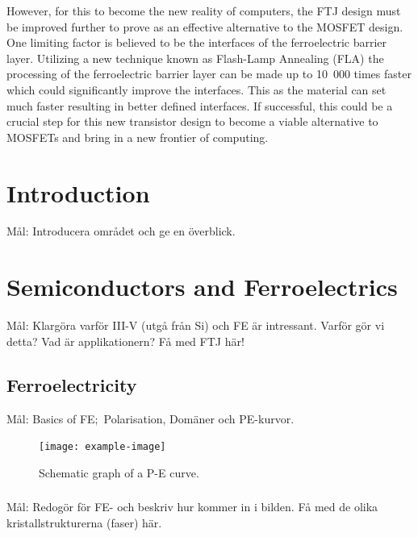 \documentclass[11pt,twoside]{eitExjobb}
\begin{document}
However, for this to become the new reality of computers, the FTJ design must be
improved further to prove as an effective alternative to the MOSFET design. One
limiting factor is believed to be the interfaces of the ferroelectric barrier
layer. Utilizing a new technique known as Flash-Lamp Annealing (FLA) the
processing of the ferroelectric barrier layer can be made up to 10 000 times
faster which could significantly improve the interfaces. This as the material
can set much faster resulting in better defined interfaces. If successful, this
could be a crucial step for this new transistor design to become a viable
alternative to MOSFETs and bring in a new frontier of computing.

\tableofcontents
\listoffigures
\listoftables
\cleardoublepage{}
\mainmatter{}
\chapter{Introduction}\label{ch:intro}

Mål: Introducera området och ge en överblick.\cite{athle2019development}
    
\chapter{Semiconductors and Ferroelectrics}\label{ch:semiandferro}

Mål: Klargöra varför III-V (utgå från Si) och FE är intressant. Varför gör vi detta? Vad är applikationern? Få med FTJ här!

\section{Ferroelectricity}\label{sec:ferro}

Mål: Basics of FE;\  Polarisation, Domäner och PE-kurvor.

\begin{figure}
    \centering
    \texttt{[image: example-image]}
    \caption{Schematic graph of a P-E curve.}
    \label{fig:theo_PE}
\end{figure}

\subsection{}

Mål: Redogör för FE- och beskriv hur  kommer in i bilden. Få med
de olika kristallstrukturerna (faser) här.
\end{document}
